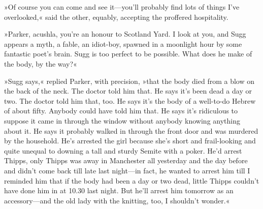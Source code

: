 »Of course you can come and see it\allowbreak---\allowbreak you'll probably find lots of things I've overlooked,« said the other, equably, accepting the proffered hospitality.

»Parker, acushla, you're an honour to Scotland Yard. I look at you, and Sugg appears a myth, a fable, an idiot-boy, spawned in a moonlight hour by some fantastic poet's brain. Sugg is too perfect to be possible. What does he make of the body, by the way?«

»Sugg says,« replied Parker, with precision, »that the body died from a blow on the back of the neck. The doctor told him that. He says it's been dead a day or two. The doctor told him that, too. He says it's the body of a well-to-do Hebrew of about fifty. Anybody could have told him that. He says it's ridiculous to suppose it came in through the window without anybody knowing anything about it. He says it probably walked in through the front door and was murdered by the household. He's arrested the girl because she's short and frail-looking and quite unequal to downing a tall and sturdy Semite with a poker. He'd arrest Thipps, only Thipps was away in Manchester all yesterday and the day before and didn't come back till late last night\allowbreak---\allowbreak in fact, he wanted to arrest him till I reminded him that if the body had been a day or two dead, little Thipps couldn't have done him in at 10.30 last night. But he'll arrest him tomorrow as an accessory\allowbreak---\allowbreak and the old lady with the knitting, too, I shouldn't wonder.«

